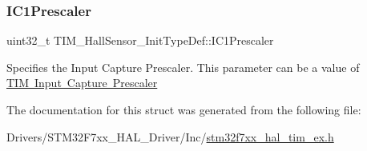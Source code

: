 \subsubsection{\texorpdfstring{IC1Prescaler}{IC1Prescaler}}
{\footnotesize\ttfamily uint32\+\_\+t T\+I\+M\+\_\+\+Hall\+Sensor\+\_\+\+Init\+Type\+Def\+::\+I\+C1\+Prescaler}

Specifies the Input Capture Prescaler. This parameter can be a value of \mbox{\hyperlink{group___t_i_m___input___capture___prescaler}{T\+IM Input Capture Prescaler}} 

The documentation for this struct was generated from the following file\+:\begin{DoxyCompactItemize}
\item 
Drivers/\+S\+T\+M32\+F7xx\+\_\+\+H\+A\+L\+\_\+\+Driver/\+Inc/\mbox{\hyperlink{stm32f7xx__hal__tim__ex_8h}{stm32f7xx\+\_\+hal\+\_\+tim\+\_\+ex.\+h}}\end{DoxyCompactItemize}
